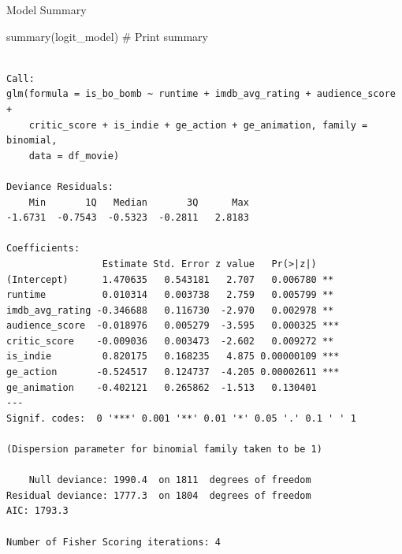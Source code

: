 \documentclass[
  10pt,
  ignorenonframetext,
]{beamer}
\newenvironment{Shaded}{\begin{snugshade}}{\end{snugshade}}
\newcommand{\CommentTok}[1]{\textcolor[rgb]{0.37,0.37,0.37}{#1}}
\newcommand{\FunctionTok}[1]{\textcolor[rgb]{0.28,0.35,0.67}{#1}}
\newcommand{\NormalTok}[1]{\textcolor[rgb]{0.00,0.23,0.31}{#1}}
\begin{document}
\begin{frame}[fragile]{Model Summary}
\label{model-summary}
\tiny

\begin{Shaded}
\begin{Highlighting}[]
\FunctionTok{summary}\NormalTok{(logit\_model) }\CommentTok{\# Print summary}
\end{Highlighting}
\end{Shaded}

\begin{verbatim}

Call:
glm(formula = is_bo_bomb ~ runtime + imdb_avg_rating + audience_score + 
    critic_score + is_indie + ge_action + ge_animation, family = binomial, 
    data = df_movie)

Deviance Residuals: 
    Min       1Q   Median       3Q      Max  
-1.6731  -0.7543  -0.5323  -0.2811   2.8183  

Coefficients:
                 Estimate Std. Error z value   Pr(>|z|)    
(Intercept)      1.470635   0.543181   2.707   0.006780 ** 
runtime          0.010314   0.003738   2.759   0.005799 ** 
imdb_avg_rating -0.346688   0.116730  -2.970   0.002978 ** 
audience_score  -0.018976   0.005279  -3.595   0.000325 ***
critic_score    -0.009036   0.003473  -2.602   0.009272 ** 
is_indie         0.820175   0.168235   4.875 0.00000109 ***
ge_action       -0.524517   0.124737  -4.205 0.00002611 ***
ge_animation    -0.402121   0.265862  -1.513   0.130401    
---
Signif. codes:  0 '***' 0.001 '**' 0.01 '*' 0.05 '.' 0.1 ' ' 1

(Dispersion parameter for binomial family taken to be 1)

    Null deviance: 1990.4  on 1811  degrees of freedom
Residual deviance: 1777.3  on 1804  degrees of freedom
AIC: 1793.3

Number of Fisher Scoring iterations: 4
\end{verbatim}
\end{frame}
\end{document}
